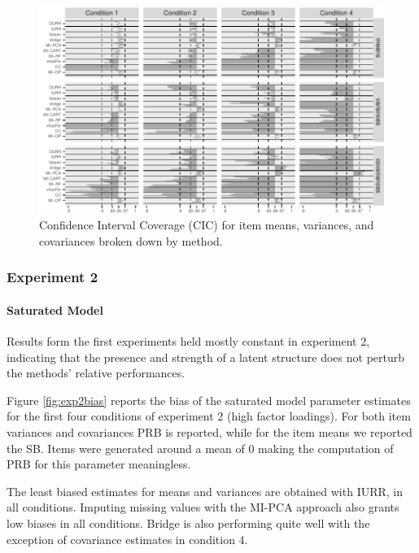 \begin{figure}
	\includegraphics{../../output/graphs/exp1_CI.pdf}
\caption{Confidence Interval Coverage (CIC) for item means, variances, and covariances broken 
	down by method.}
\label{fig:exp1cir}
\end{figure}
	
\FloatBarrier %

\subsubsection{Experiment 2}

\paragraph{Saturated Model}

	Results form the first experiments held mostly constant in experiment 2, indicating that the presence and 
	strength of a latent structure does not perturb the methods' relative performances.

	Figure \ref{fig:exp2bias} reports the bias of the saturated model parameter estimates for the first
	four conditions of experiment 2 (high factor loadings). 
	For both item variances and covariances PRB is reported, while for the item means we reported the SB. 
	Items were generated around a mean of 0 making the computation of PRB for this parameter meaningless.

	The least biased estimates for means and variances are obtained with IURR, in all conditions.
	Imputing missing values with the MI-PCA approach also grants low biases in all conditions.
	Bridge is also performing quite well with the exception of covariance estimates in condition 4.

